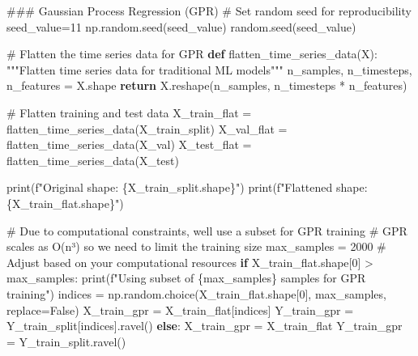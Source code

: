 \documentclass[
  letterpaper,
  DIV=11,
  numbers=noendperiod]{scrreprt}
\newenvironment{Shaded}{\begin{snugshade}}{\end{snugshade}}
\newcommand{\BuiltInTok}[1]{\textcolor[rgb]{0.00,0.23,0.31}{#1}}
\newcommand{\CommentTok}[1]{\textcolor[rgb]{0.37,0.37,0.37}{#1}}
\newcommand{\ControlFlowTok}[1]{\textcolor[rgb]{0.00,0.23,0.31}{\textbf{#1}}}
\newcommand{\DecValTok}[1]{\textcolor[rgb]{0.68,0.00,0.00}{#1}}
\newcommand{\KeywordTok}[1]{\textcolor[rgb]{0.00,0.23,0.31}{\textbf{#1}}}
\newcommand{\NormalTok}[1]{\textcolor[rgb]{0.00,0.23,0.31}{#1}}
\newcommand{\OperatorTok}[1]{\textcolor[rgb]{0.37,0.37,0.37}{#1}}
\newcommand{\SpecialCharTok}[1]{\textcolor[rgb]{0.37,0.37,0.37}{#1}}
\newcommand{\SpecialStringTok}[1]{\textcolor[rgb]{0.13,0.47,0.30}{#1}}
\newcommand{\VariableTok}[1]{\textcolor[rgb]{0.07,0.07,0.07}{#1}}
\begin{document}
\begin{Shaded}
\begin{Highlighting}[]
\CommentTok{\#\#\# Gaussian Process Regression (GPR)}
\CommentTok{\# Set random seed for reproducibility}
\NormalTok{seed\_value}\OperatorTok{=}\DecValTok{11}
\NormalTok{np.random.seed(seed\_value)}
\NormalTok{random.seed(seed\_value)}

\CommentTok{\# Flatten the time series data for GPR}
\KeywordTok{def}\NormalTok{ flatten\_time\_series\_data(X):}
    \CommentTok{"""Flatten time series data for traditional ML models"""}
\NormalTok{    n\_samples, n\_timesteps, n\_features }\OperatorTok{=}\NormalTok{ X.shape}
    \ControlFlowTok{return}\NormalTok{ X.reshape(n\_samples, n\_timesteps }\OperatorTok{*}\NormalTok{ n\_features)}

\CommentTok{\# Flatten training and test data}
\NormalTok{X\_train\_flat }\OperatorTok{=}\NormalTok{ flatten\_time\_series\_data(X\_train\_split)}
\NormalTok{X\_val\_flat }\OperatorTok{=}\NormalTok{ flatten\_time\_series\_data(X\_val)}
\NormalTok{X\_test\_flat }\OperatorTok{=}\NormalTok{ flatten\_time\_series\_data(X\_test)}

\BuiltInTok{print}\NormalTok{(}\SpecialStringTok{f"Original shape: }\SpecialCharTok{\{}\NormalTok{X\_train\_split}\SpecialCharTok{.}\NormalTok{shape}\SpecialCharTok{\}}\SpecialStringTok{"}\NormalTok{)}
\BuiltInTok{print}\NormalTok{(}\SpecialStringTok{f"Flattened shape: }\SpecialCharTok{\{}\NormalTok{X\_train\_flat}\SpecialCharTok{.}\NormalTok{shape}\SpecialCharTok{\}}\SpecialStringTok{"}\NormalTok{)}

\CommentTok{\# Due to computational constraints, we\textquotesingle{}ll use a subset for GPR training}
\CommentTok{\# GPR scales as O(n³) so we need to limit the training size}
\NormalTok{max\_samples }\OperatorTok{=} \DecValTok{2000}  \CommentTok{\# Adjust based on your computational resources}
\ControlFlowTok{if}\NormalTok{ X\_train\_flat.shape[}\DecValTok{0}\NormalTok{] }\OperatorTok{\textgreater{}}\NormalTok{ max\_samples:}
    \BuiltInTok{print}\NormalTok{(}\SpecialStringTok{f"Using subset of }\SpecialCharTok{\{}\NormalTok{max\_samples}\SpecialCharTok{\}}\SpecialStringTok{ samples for GPR training"}\NormalTok{)}
\NormalTok{    indices }\OperatorTok{=}\NormalTok{ np.random.choice(X\_train\_flat.shape[}\DecValTok{0}\NormalTok{], max\_samples, replace}\OperatorTok{=}\VariableTok{False}\NormalTok{)}
\NormalTok{    X\_train\_gpr }\OperatorTok{=}\NormalTok{ X\_train\_flat[indices]}
\NormalTok{    Y\_train\_gpr }\OperatorTok{=}\NormalTok{ Y\_train\_split[indices].ravel()}
\ControlFlowTok{else}\NormalTok{:}
\NormalTok{    X\_train\_gpr }\OperatorTok{=}\NormalTok{ X\_train\_flat}
\NormalTok{    Y\_train\_gpr }\OperatorTok{=}\NormalTok{ Y\_train\_split.ravel()}


\end{Highlighting}
\end{Shaded}
\end{document}
